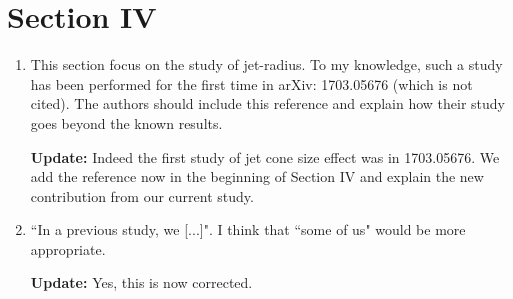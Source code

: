 \documentclass[12pt]{article}
\begin{document}
\section*{Section IV}
\begin{enumerate}
\item This section focus on the study of jet-radius. To my knowledge, such a study has been performed for the first time in arXiv: 1703.05676 (which is not cited). The authors should include this reference and explain how their study goes beyond the known results.

{\bf Update:} Indeed the first study of jet cone size effect was in 1703.05676. We add the reference now in the beginning of Section IV and explain the new contribution from our current study.

\item ``In a previous study, we [...]". I think that ``some of us" would be more appropriate.

{\bf Update:} Yes, this is now corrected.

\end{enumerate}
\end{document}

